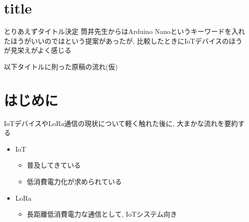 

\section{title}
とりあえずタイトル決定
筒井先生からはArduino Nanoというキーワードを入れたほうがいいのではという提案があったが, 
比較したときにIoTデバイスのほうが見栄えがよく感じる

以下タイトルに則った原稿の流れ(仮)
\section{はじめに}
IoTデバイスやLoRa通信の現状について軽く触れた後に, 大まかな流れを要約する
\begin{itemize}
    \item IoT
    \begin{itemize}
        \item 普及してきている
        \item 低消費電力化が求められている
    \end{itemize}

    \item LoRa
    \begin{itemize}
        \item 長距離低消費電力な通信として, IoTシステム向き
    \end{itemize}
\end{itemize}
        
